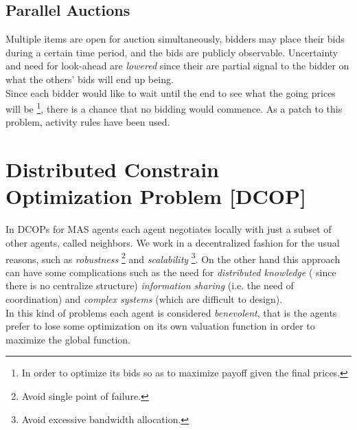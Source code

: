 \documentclass[10pt,a4paper]{article}
\begin{document}
\subsection{Parallel Auctions}
Multiple items are open for auction simultaneously, bidders may place their bids during a certain time period, and the bids are publicly observable. Uncertainty and need for look-ahead are \textit{lowered} since their are partial signal to the bidder on what the others' bids will end up being.\\
Since each bidder would like to wait until the end to see what the going prices will be \footnote{In order to optimize its bids so as to maximize payoff given the final prices.}, there is a chance that no bidding would commence. As a patch to this problem, activity rules have been used.



\newpage


\section{Distributed Constrain Optimization Problem [DCOP]}
In DCOPs for MAS agents each agent negotiates locally with just a subset of other agents, called neighbors.
We work in a decentralized fashion for the usual reasons, such as \textit{robustness} \footnote{Avoid single point of failure.} and \textit{scalability} \footnote{Avoid excessive bandwidth allocation.}. On the other hand this approach can have some complications such as the need for \textit{distributed knowledge} ( since there is no centralize structure) \textit{information sharing} (i.e. the need of coordination) and \textit{complex systems} (which are difficult to design).\\
In this kind of problems each agent is considered \textit{benevolent}, that is the agents prefer to lose some optimization on its own valuation function in order to maximize the global function.
\end{document}
